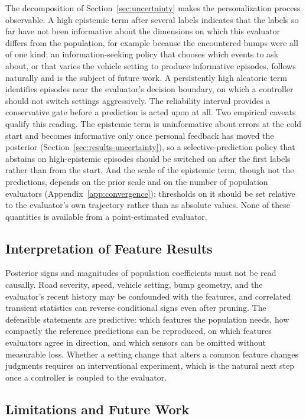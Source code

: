 \documentclass[lettersize,journal]{IEEEtran}
\begin{document}
The decomposition of Section~\ref{sec:uncertainty} makes the personalization process observable. A high epistemic term after several labels indicates that the labels so far have not been informative about the dimensions on which this evaluator differs from the population, for example because the encountered bumps were all of one kind; an information-seeking policy that chooses which events to ask about, or that varies the vehicle setting to produce informative episodes, follows naturally and is the subject of future work. A persistently high aleatoric term identifies episodes near the evaluator's decision boundary, on which a controller should not switch settings aggressively. The reliability interval provides a conservative gate before a prediction is acted upon at all. Two empirical caveats qualify this reading. The epistemic term is uninformative about errors at the cold start and becomes informative only once personal feedback has moved the posterior (Section~\ref{sec:results-uncertainty}), so a selective-prediction policy that abstains on high-epistemic episodes should be switched on after the first labels rather than from the start. And the scale of the epistemic term, though not the predictions, depends on the prior scale and on the number of population evaluators (Appendix~\ref{app:convergence}); thresholds on it should be set relative to the evaluator's own trajectory rather than as absolute values. None of these quantities is available from a point-estimated evaluator.

\subsection{Interpretation of Feature Results}

Posterior signs and magnitudes of population coefficients must not be read causally. Road severity, speed, vehicle setting, bump geometry, and the evaluator's recent history may be confounded with the features, and correlated transient statistics can reverse conditional signs even after pruning. The defensible statements are predictive: which features the population needs, how compactly the reference predictions can be reproduced, on which features evaluators agree in direction, and which sensors can be omitted without measurable loss. Whether a setting change that alters a common feature changes judgments requires an interventional experiment, which is the natural next step once a controller is coupled to the evaluator.

\subsection{Limitations and Future Work}
\end{document}
